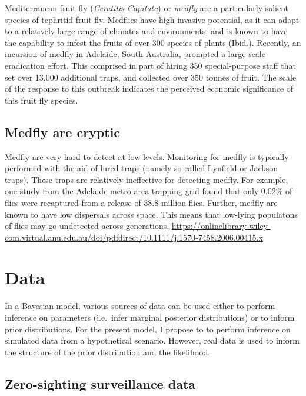 \documentclass[
]{book}
\begin{document}
Mediterranean fruit fly (\emph{Ceratitis Capitata}) or \emph{medfly} are a particularly salient species of tephritid fruit fly. Medflies have high invasive potential, as it can adapt to a relatively large range of climates and environments, and is known to have the capability to infest the fruits of over 300 species of plants (Ibid.). Recently, an incursion of medfly in Adelaide, South Australia, prompted a large scale eradication effort. This comprised in part of hiring 350 special-purpose staff that set over 13,000 additional traps, and collected over 350 tonnes of fruit. The scale of the response to this outbreak indicates the perceived economic significance of this fruit fly species.

\hypertarget{medfly-are-cryptic}{%
\subsection{Medfly are cryptic}\label{medfly-are-cryptic}}

Medfly are very hard to detect at low levels. Monitoring for medfly is typically performed with the aid of lured traps (namely so-called Lynfield or Jackson traps). These traps are relatively ineffective for detecting medfly. For example, one study from the Adelaide metro area trapping grid found that only 0.02\% of flies were recaptured from a release of 38.8 million flies. Further, medfly are known to have low dispersals across space. This means that low-lying populatons of flies may go undetected across generations. \url{https://onlinelibrary-wiley-com.virtual.anu.edu.au/doi/pdfdirect/10.1111/j.1570-7458.2006.00415.x}

\hypertarget{data}{%
\section{Data}\label{data}}

In a Bayesian model, various sources of data can be used either to perform inference on parameters (i.e.~infer marginal posterior distributions) or to inform prior distributions. For the present model, I propose to to perform inference on simulated data from a hypothetical scenario. However, real data is used to inform the structure of the prior distribution and the likelihood.

\hypertarget{zero-sighting-surveillance-data}{%
\subsection{Zero-sighting surveillance data}\label{zero-sighting-surveillance-data}}
\end{document}

